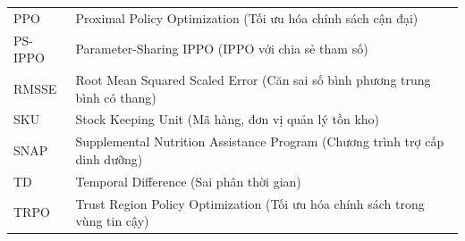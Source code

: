 {\begin{longtable}{p{2.5cm} p{12cm}}
PPO & Proximal Policy Optimization (Tối ưu hóa chính sách cận đại) \\
PS-IPPO & Parameter-Sharing IPPO (IPPO với chia sẻ tham số) \\
RMSSE & Root Mean Squared Scaled Error (Căn sai số bình phương trung bình có thang) \\
SKU & Stock Keeping Unit (Mã hàng, đơn vị quản lý tồn kho) \\
SNAP & Supplemental Nutrition Assistance Program (Chương trình trợ cấp dinh dưỡng) \\
TD & Temporal Difference (Sai phân thời gian) \\
TRPO & Trust Region Policy Optimization (Tối ưu hóa chính sách trong vùng tin cậy) \\
\end{longtable}
} 
\clearpage